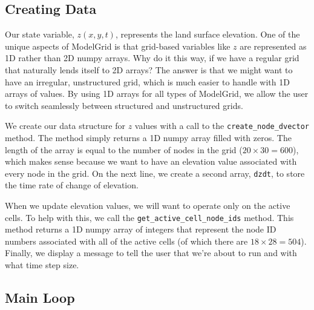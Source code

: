 \documentclass[12pt]{article}
\newcommand{\code}[1]{{\tt #1}}
\begin{document}
\subsection{Creating Data}



Our state variable, $z(x,y,t)$, represents the land surface elevation. One of the unique aspects of ModelGrid is that grid-based variables like $z$ are represented as 1D rather than 2D numpy arrays. Why do it this way, if we have a regular grid that naturally lends itself to 2D arrays? The answer is that we might want to have an irregular, unstructured grid, which is much easier to handle with 1D arrays of values. By using 1D arrays for all types of ModelGrid, we allow the user to switch seamlessly between structured and unstructured grids.

We create our data structure for $z$ values with a call to the \code{create\_node\_dvector} method. The method simply returns a 1D numpy array filled with zeros. The length of the array is equal to the number of nodes in the grid ($20\times 30=600$), which makes sense because we want to have an elevation value associated with every node in the grid.
On the next line, we create a second array, \code{dzdt}, to store the time rate of change of elevation. 

When we update elevation values, we will want to operate only on the active cells. To help with this, we call the \code{get\_active\_cell\_node\_ids} method. This method returns a 1D numpy array of integers that represent the node ID numbers associated with all of the active cells (of which there are $18\times 28 = 504$). Finally, we display a message to tell the user that we're about to run and with what time step size.


\subsection{Main Loop}
\end{document}
